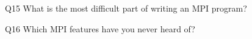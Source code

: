 \begin{description}%
\item{Q15} What is the most difficult part of writing an MPI program?%
\item{Q16} Which MPI features have you never heard of?%
\end{description}%
